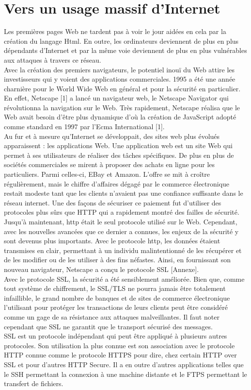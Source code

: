 \section{Vers un usage massif d'Internet}
Les premières pages Web ne tardent pas à voir le jour aidées en cela par la création du langage Html. En outre, les ordinateurs deviennent de plus en plus dépendants d’Internet et par la même voie deviennent de plus en plus vulnérables aux attaques à travers ce réseau.\\
Avec la création des premiers navigateurs, le potentiel inouï du Web attire les investisseurs qui y voient des applications commerciales. 1995 a été une année charnière pour le World Wide Web en général et pour la sécurité en particulier. En effet, Netscape [1] a lancé un navigateur web, le Netscape Navigator qui révolutionna la navigation sur le Web. Très rapidement, Netscape réalisa que le Web avait besoin d’être plus dynamique d’où la création de JavaScript adopté comme standard en 1997 par l’Ecma International [1]. \\
Au fur et à mesure qu'Internet se développait, des sites web plus évolués apparaissent : les applications Web. Une application web est un site Web qui permet à ses utilisateurs de réaliser des tâches spécifiques. De plus en plus de sociétés commerciales se mirent à proposer des achats en ligne pour les particuliers. Parmi celles-ci, EBay et Amazon. L'offre se mit à croître régulièrement, mais le chiffre d'affaires dégagé par le commerce électronique restait modeste tant que les clients n'avaient pas une confiance suffisante dans le réseau internet. Une des façons de sécuriser ce paiement fut d'utiliser des protocoles plus sûrs que HTTP qui a rapidement montré des failles de sécurité.\\
Jusqu’à maintenant, http était le seul protocole utilisé sur le Web. Cependant, avec les  nouvelles avancées que ce dernier a connues, les enjeux de la sécurité y sont devenus plus importants. Avec le protocole http, les données étaient transmises en clair, permettant à un individu malintentionné de les récupérer et de les modifier ou de les utiliser à des fins néfastes. Ainsi, en fournissant son nouveau navigateur, Netscape a conçu le protocole SSL [Annexe].\\
Avec le protocole SSL, la sécurité a été sensiblement améliorée. Bien que, comme tout système de chiffrement, le SSL/TLS ne pourra jamais être totalement infaillible, le grand nombre de banques et de sites de commerce électronique l'utilisant pour protéger les transactions de leurs clients peut être considéré comme un gage de sa résistance aux attaques malveillantes. Il faut noter cependant que SSL ne garantit que le transport sécurisé des messages.\\
SSL est un protocole indépendant qui peut être appliqué à plusieurs autres protocoles. Son utilisation la plus connue est son association avec le protocole HTTP connue comme le protocole HTTPS pour dire, chez certain HTTP over SSL et pour d’autres HTTP Secure. Il a en outre d’autres applications telles que le SSH permettant la connexion à une machine distante et le FTPS permettant le transfert de fichiers.


\clearpage 
